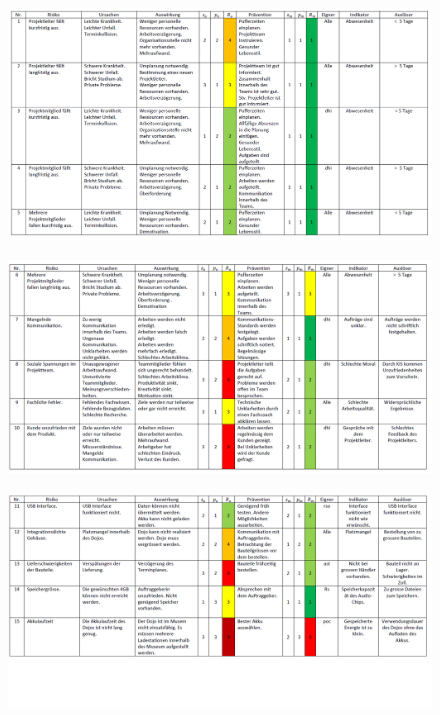 \documentclass[10pt,a4paper,oneside]{99_fhnwreport}
\begin{document}
\begin{landscape}

\begin{figure}[htbp]
	\centering
	\includegraphics[width=25.5cm]{risikoAnalyse1.png}
\end{figure}

\begin{figure}[htbp]
	\centering
	\includegraphics[width=25.5cm]{risikoAnalyse2.png}
\end{figure}

\begin{figure}[htbp]
	\centering
	\includegraphics[width=25.5cm]{risikoAnalyse3.png}
\end{figure}

\end{landscape}

\end{document}
